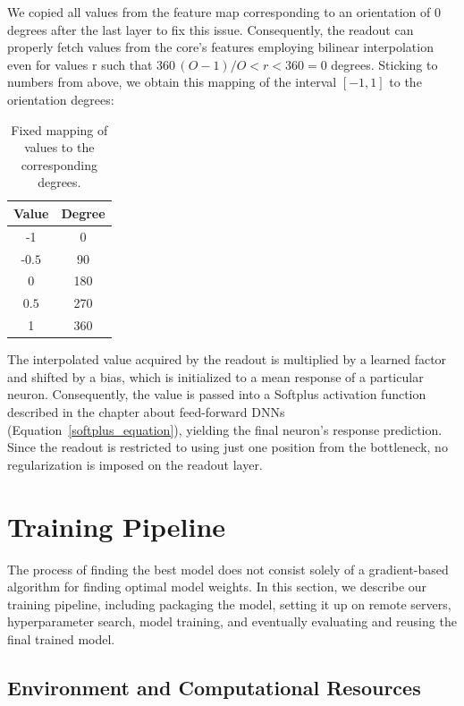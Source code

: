 We copied all values from the feature map corresponding to an orientation of 0 degrees after the last layer to fix this issue. Consequently, the readout can properly fetch values from the core’s features employing bilinear interpolation even for values r such that $360\,(O - 1)/O< r < 360 = 0$ degrees. Sticking to numbers from above, we obtain this mapping of the interval $[-1, 1]$ to the orientation degrees:


\begin{table}[H]\centering
	\begin{tabular}{ | c | c | } 
		\hline
		Value & Degree \\
		\hline
		-1 & 0 \\
		
		-$0.5$ & 90 \\
		$0$ & 180 \\
		$0.5$ & 270 \\
		
		1 & 360 \\ 
		\hline
	\end{tabular}
	\caption{Fixed mapping of values to the corresponding degrees.}\label{tab002}
\end{table}


The interpolated value acquired by the readout is multiplied by a learned factor and shifted by a bias, which is initialized to a mean response of a particular neuron. Consequently, the value is passed into a Softplus activation function described in the chapter about feed-forward DNNs (Equation~\ref{softplus_equation}), yielding the final neuron’s response prediction. Since the readout is restricted to using just one position from the bottleneck, no regularization is imposed on the readout layer.


\section{Training Pipeline}

The process of finding the best model does not consist solely of a gradient-based algorithm for finding optimal model weights. In this section, we describe our training pipeline, including packaging the model, setting it up on remote servers, hyperparameter search, model training, and eventually evaluating and reusing the final trained model.

\subsection{Environment and Computational Resources}

